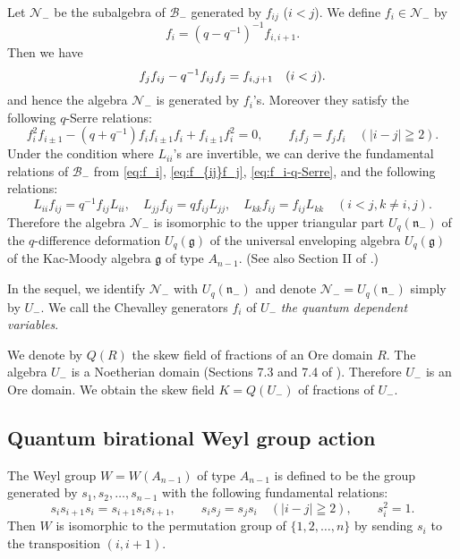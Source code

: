 \documentclass[12pt,twoside]{article}
\newcommand\B{{\mathcal B}}
\newcommand\N{{\mathcal N}}
\newcommand\g{{\mathfrak g}}
\newcommand\n{{\mathfrak n}}
\theoremstyle{plain} %
\theoremstyle{definition} %
\theoremstyle{definition} %
\numberwithin{theorem}{section}
\numberwithin{equation}{section}
\numberwithin{figure}{section}
\numberwithin{table}{section}
\begin{document}
Let $\N_-$ be the subalgebra of $\B_-$ generated by $f_{ij}$ ($i<j$).
We define $f_i\in\N_-$ by
\begin{equation}
 f_i = (q-q^{-1})^{-1} f_{i,i+1}.
 \label{eq:f_i}
\end{equation}
Then we have
\begin{equation}
 f_j f_{ij} - q^{-1} f_{ij} f_j = f_{i,j+1} \quad (i<j).
 \label{eq:f_{ij}f_j}
\end{equation}
and hence the algebra $\N_-$ is generated by $f_i$'s.
Moreover they satisfy the following $q$-Serre relations:
\begin{equation}
 f_i^2 f_{i\pm1} - (q+q^{-1}) f_if_{i\pm1}f_i + f_{i\pm1}f_i^2=0, \qquad
 f_if_j=f_jf_i \quad (|i-j|\geqq 2).
 \label{eq:f_i-q-Serre}
\end{equation}
Under the condition where $L_{ii}$'s are invertible, 
we can derive the fundamental relations of $\B_-$ from
\eqref{eq:f_i}, \eqref{eq:f_{ij}f_j}, \eqref{eq:f_i-q-Serre},  
and the following relations:
\begin{equation*}
 L_{ii}f_{ij}=q^{-1}f_{ij}L_{ii}, \quad
 L_{jj}f_{ij}=q     f_{ij}L_{jj}, \quad
 L_{kk}f_{ij}=f_{ij}L_{kk} \quad
 (i<j, k\ne i,j).
\end{equation*}
Therefore the algebra $\N_-$ is isomorphic to  
the upper triangular part $U_q(\n_-)$ 
of the $q$-difference deformation $U_q(\g)$ of
the universal enveloping algebra $U_q(\g)$ 
of the Kac-Moody algebra $\g$ of type $A_{n-1}$.
(See also Section II of \cite{DF}.)

In the sequel, we identify $\N_-$ with $U_q(\n_-)$
and denote $\N_-=U_q(\n_-)$ simply by $U_-$. 
We call the Chevalley generators $f_i$ of $U_-$ 
{\em the quantum dependent variables}.

We denote by $Q(R)$ the skew field of fractions of an Ore domain $R$.
The algebra $U_-$ is a Noetherian domain 
(Sections 7.3 and 7.4 of \cite{Jos-1995}).
Therefore $U_-$ is an Ore domain.
We obtain the skew field $K=Q(U_-)$ of fractions of $U_-$. 


\subsection{Quantum birational Weyl group action}
\label{sec:Weyl-A_{n-1}}

The Weyl group $W=W(A_{n-1})$ of type $A_{n-1}$ is defined to be the group
generated by $s_1,s_2,\ldots,s_{n-1}$ with the following fundamental relations:
\begin{equation}
 s_i s_{i+1}s_i = s_{i+1}s_i s_{i+1}, \qquad
 s_i s_j = s_j s_i \quad (|i-j|\geqq 2), \qquad
 s_i^2 = 1.
 \label{eq:Weyl}
\end{equation}
Then $W$ is isomorphic to the permutation group of $\{1,2,\ldots,n\}$ 
by sending $s_i$ to the transposition $(i,i+1)$.
\end{document}
